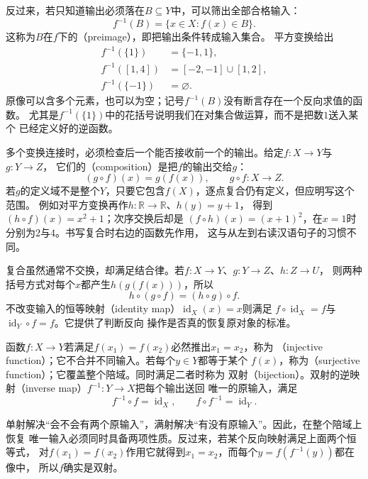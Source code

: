 反过来，若只知道输出必须落在$B\subseteq Y$中，可以筛出全部合格输入：
\begin{equation}
  f^{-1}(B)=\{x\in X:f(x)\in B\}.
  \label{eq:prelim-preimage}
\end{equation}
这称为$B$在$f$下的（preimage），即把输出条件转成输入集合。
平方变换给出
\[
  \begin{aligned}
    f^{-1}(\{1\})&=\{-1,1\},\\
    f^{-1}([1,4])&=[-2,-1]\cup[1,2],\\
    f^{-1}(\{-1\})&=\varnothing.
  \end{aligned}
\]
原像可以含多个元素，也可以为空；记号$f^{-1}(B)$没有断言存在一个反向求值的函数。
尤其是$f^{-1}(\{1\})$中的花括号说明我们在对集合做运算，而不是把数$1$送入某个
已经定义好的逆函数。

多个变换连接时，必须检查后一个能否接收前一个的输出。给定$f:X\to Y$与$g:Y\to Z$，
它们的（composition）是把$f$的输出交给$g$：
\[
  (g\circ f)(x)=g(f(x)),\qquad g\circ f:X\to Z.
\]
若$g$的定义域不是整个$Y$，只要它包含$f(X)$，逐点复合仍有定义，但应明写这个范围。
例如对平方变换再作$h:\mathbb{R}\to\mathbb{R}$、$h(y)=y+1$，
得到$(h\circ f)(x)=x^2+1$；次序交换后却是
$(f\circ h)(x)=(x+1)^2$，在$x=1$时分别为$2$与$4$。书写复合时右边的函数先作用，
这与从左到右读汉语句子的习惯不同。

复合虽然通常不交换，却满足结合律。若$f:X\to Y$、$g:Y\to Z$、$h:Z\to U$，
则两种括号方式对每个$x$都产生$h(g(f(x)))$，所以
\[
  h\circ(g\circ f)=(h\circ g)\circ f.
\]
不改变输入的恒等映射（identity map）$\operatorname{id}_X(x)=x$则满足
$f\circ\operatorname{id}_X=f$与$\operatorname{id}_Y\circ f=f$。它提供了判断反向
操作是否真的恢复原对象的标准。

\begin{definition}[单射、满射与逆映射]
\label{def:prelim-invertible-map}
函数$f:X\to Y$若满足$f(x_1)=f(x_2)$必然推出$x_1=x_2$，称为
（injective function）；它不合并不同输入。若每个$y\in Y$都等于某个
$f(x)$，称为（surjective function）；它覆盖整个陪域。同时满足二者时称为
双射（bijection）。双射的逆映射（inverse map）$f^{-1}:Y\to X$把每个输出送回
唯一的原输入，满足
\[
  f^{-1}\circ f=\operatorname{id}_X,\qquad
  f\circ f^{-1}=\operatorname{id}_Y.
\]
\end{definition}

单射解决“会不会有两个原输入”，满射解决“有没有原输入”。因此，在整个陪域上恢复
唯一输入必须同时具备两项性质。反过来，若某个反向映射满足上面两个恒等式，
对$f(x_1)=f(x_2)$作用它就得到$x_1=x_2$，而每个$y=f(f^{-1}(y))$都在像中，
所以$f$确实是双射。

